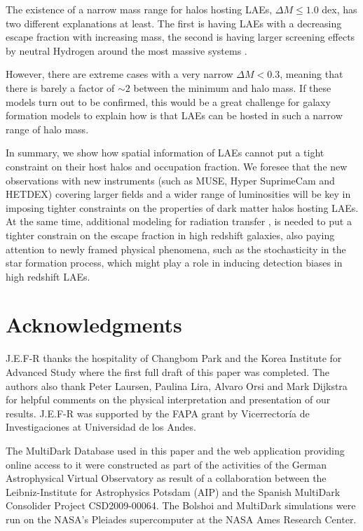\documentclass[usenatbib]{mn2e}
\newcommand{\ly}{{\ifmmode{{\rm Ly}\alpha}\else{Ly$\alpha$~}\fi}}
\begin{document}
The existence of a narrow mass range for halos hosting LAEs, $\Delta
M\leq 1.0$ dex, has two different explanations at least. The
first is having LAEs with a decreasing \ly escape fraction with
increasing mass, the second is having larger screening effects by
neutral Hydrogen around the most massive systems
\citep{Laursen2009,ForeroRomero2011}.   

However, there are extreme cases with a very narrow $\Delta M<0.3$, meaning that
there is barely a factor of $\sim 2$ between the minimum and halo
mass. If these models turn out to be confirmed, this would be a great
challenge for galaxy formation models to explain how is that LAEs can
be hosted in such a narrow range of halo mass. 

In summary, we show how spatial information of LAEs cannot
put a tight constraint on their host halos and occupation fraction. We
foresee that the new observations with new instruments (such as MUSE,
Hyper SuprimeCam and HETDEX) covering larger fields and a wider range
of luminosities will be key in imposing tighter constraints on the
properties of dark matter halos hosting LAEs. At the same time,
additional modeling for \ly radiation transfer , is needed to put a
tighter constrain on the \ly escape fraction in high redshift
galaxies, also paying attention to newly framed physical phenomena, such as the
stochasticity \citep{ForeroRomero2013} in the star formation process,
which might play a role in inducing detection biases in high redshift LAEs.


\section*{Acknowledgments} 
J.E.F-R thanks the hospitality of Changbom Park and the Korea
Institute for Advanced Study where the first full draft of this paper
was completed. The authors also thank Peter Laursen, Paulina Lira, 
Alvaro Orsi and Mark Dijkstra for helpful comments on the physical
interpretation and presentation of our results. J.E.F-R was
supported by the FAPA grant by Vicerrector\'ia de Investigaciones at
Universidad de los Andes.

The MultiDark Database used in this paper and the web application
providing online access to it were constructed as part of the
activities of the German Astrophysical Virtual Observatory as result
of a collaboration between the Leibniz-Institute for Astrophysics
Potsdam (AIP) and the Spanish MultiDark Consolider Project
CSD2009-00064. The Bolshoi and MultiDark simulations were run on the
NASA's Pleiades supercomputer at the NASA Ames Research Center.




 
\end{document}
